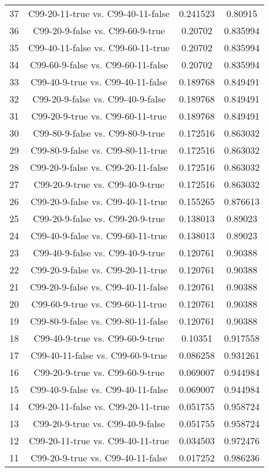 \documentclass[a4paper,10pt]{article}
\begin{document}
\begin{landscape}
\begin{table}[!htp]
\begin{tabular}{cccc}
37&C99-20-11-true vs. C99-40-11-false&0.241523&0.80915\\
36&C99-20-9-false vs. C99-60-9-true&0.20702&0.835994\\
35&C99-40-11-false vs. C99-60-11-true&0.20702&0.835994\\
34&C99-60-9-false vs. C99-60-11-false&0.20702&0.835994\\
33&C99-40-9-true vs. C99-40-11-false&0.189768&0.849491\\
32&C99-20-9-false vs. C99-40-9-false&0.189768&0.849491\\
31&C99-20-9-true vs. C99-60-11-true&0.189768&0.849491\\
30&C99-80-9-false vs. C99-80-9-true&0.172516&0.863032\\
29&C99-80-9-false vs. C99-80-11-true&0.172516&0.863032\\
28&C99-20-9-false vs. C99-20-11-false&0.172516&0.863032\\
27&C99-20-9-true vs. C99-40-9-true&0.172516&0.863032\\
26&C99-20-9-false vs. C99-40-11-true&0.155265&0.876613\\
25&C99-20-9-false vs. C99-20-9-true&0.138013&0.89023\\
24&C99-40-9-false vs. C99-60-11-true&0.138013&0.89023\\
23&C99-40-9-false vs. C99-40-9-true&0.120761&0.90388\\
22&C99-20-9-false vs. C99-20-11-true&0.120761&0.90388\\
21&C99-20-9-false vs. C99-40-11-false&0.120761&0.90388\\
20&C99-60-9-true vs. C99-60-11-true&0.120761&0.90388\\
19&C99-80-9-false vs. C99-80-11-false&0.120761&0.90388\\
18&C99-40-9-true vs. C99-60-9-true&0.10351&0.917558\\
17&C99-40-11-false vs. C99-60-9-true&0.086258&0.931261\\
16&C99-20-9-true vs. C99-60-9-true&0.069007&0.944984\\
15&C99-40-9-false vs. C99-40-11-false&0.069007&0.944984\\
14&C99-20-11-false vs. C99-20-11-true&0.051755&0.958724\\
13&C99-20-9-true vs. C99-40-9-false&0.051755&0.958724\\
12&C99-20-11-true vs. C99-40-11-true&0.034503&0.972476\\
11&C99-20-9-true vs. C99-40-11-false&0.017252&0.986236\\

\end{tabular}
\end{table}
\end{landscape}
\end{document}
